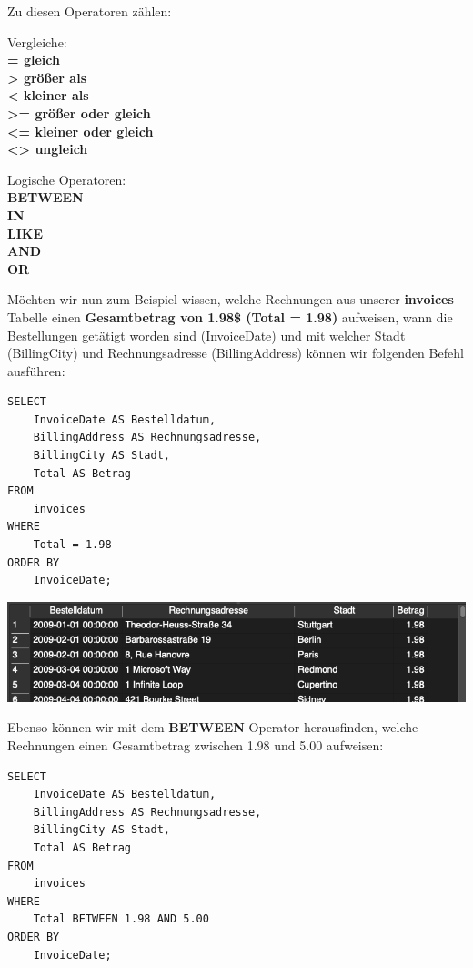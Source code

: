 \documentclass[
]{book}
\begin{document}
Zu diesen Operatoren zählen:

Vergleiche:\\
\textbf{= gleich}\\
\textbf{\textgreater{} größer als}\\
\textbf{\textless{} kleiner als}\\
\textbf{\textgreater= größer oder gleich}\\
\textbf{\textless= kleiner oder gleich}\\
\textbf{\textless\textgreater{} ungleich}

Logische Operatoren:\\
\textbf{BETWEEN}\\
\textbf{IN}\\
\textbf{LIKE}\\
\textbf{AND}\\
\textbf{OR}

Möchten wir nun zum Beispiel wissen, welche Rechnungen aus unserer \textbf{invoices} Tabelle einen \textbf{Gesamtbetrag von 1.98\$ (Total = 1.98)} aufweisen, wann die Bestellungen getätigt worden sind (InvoiceDate) und mit welcher Stadt (BillingCity) und Rechnungsadresse (BillingAddress) können wir folgenden Befehl ausführen:

\begin{verbatim}
SELECT
    InvoiceDate AS Bestelldatum,
    BillingAddress AS Rechnungsadresse,
    BillingCity AS Stadt,
    Total AS Betrag
FROM
    invoices
WHERE
    Total = 1.98
ORDER BY
    InvoiceDate;
\end{verbatim}

\includegraphics[width=10.41667in,height=\textheight]{img-WHERE1.png}

Ebenso können wir mit dem \textbf{BETWEEN} Operator herausfinden, welche Rechnungen einen Gesamtbetrag zwischen 1.98 und 5.00 aufweisen:

\begin{verbatim}
SELECT
    InvoiceDate AS Bestelldatum,
    BillingAddress AS Rechnungsadresse,
    BillingCity AS Stadt,
    Total AS Betrag
FROM
    invoices
WHERE
    Total BETWEEN 1.98 AND 5.00
ORDER BY
    InvoiceDate;
\end{verbatim}
\end{document}
